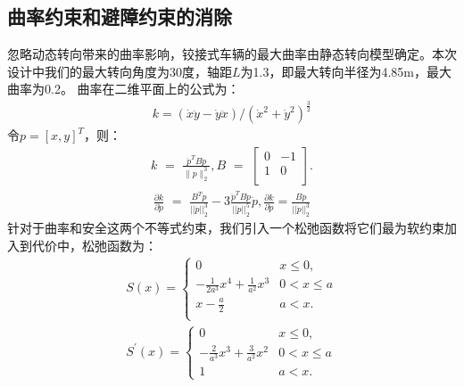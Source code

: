 \documentclass[master,academic]{ysuthesis} %
\begin{document}
		\subsection{曲率约束和避障约束的消除}
		忽略动态转向带来的曲率影响，铰接式车辆的最大曲率由静态转向模型确定。本次设计中我们的最大转向角度为30度，轴距$L$为1.3，即最大转向半径为4.85m，最大曲率为0.2。
		曲率在二维平面上的公式为：
		\begin{equation}
			\begin{aligned}
				k=( \dot{x}\ddot{y}-\dot{y}\ddot{x} ) /( \dot{x}^2+\dot{y}^2 ) ^{\frac{3}{2}}
			\end{aligned}
		\end{equation}
		令$p =[x,y]^T$，则：
		\begin{equation}
			\begin{aligned}
				k\,\,=\,\,\frac{\ddot{p}^TB\dot{p}}{\lVert p \rVert _{2}^{3}},B\,\,=\,\,\left[ \begin{matrix}
					0&		-1\\
					1&		0\\
				\end{matrix} \right] .
			\end{aligned}
		\end{equation}
		\begin{equation}
			\begin{aligned}
				\frac{\partial k}{\partial \dot{p}}\,\,=\,\,\frac{B^T\ddot{p}}{||\dot{p}||_{2}^{3}}-3\frac{\ddot{p}^TB\dot{p}}{||\dot{p}||_{2}^{5}}\dot{p},\frac{\partial k}{\partial \ddot{p}}=\frac{B\dot{p}}{||\dot{p}||_{2}^{3}}
			\end{aligned}
		\end{equation}
		针对于曲率和安全这两个不等式约束，我们引入一个松弛函数将它们最为软约束加入到代价中，松弛函数为：
		\begin{equation}
			\begin{aligned}
				S( x ) =\left\{ \begin{matrix}
					0&		x\le 0,\\
					-\frac{1}{2a^3}x^4+\frac{1}{a^2}x^3&		0<x\le a\\
					x-\frac{a}{2}&		a<x.\\
				\end{matrix} \right.  \\
					S^{'}(x) = \left\{\begin{matrix}
					0& x\le0, \\
					-\frac{2}{a^3}x^3+\frac{3}{a^2}x^2& 0 < x \le a \\
					1& a < x.
				\end{matrix}\right.
			\end{aligned}
		\end{equation}
\end{document}
